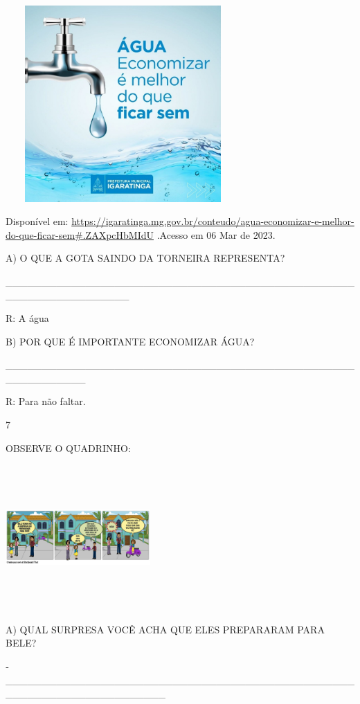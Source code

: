 {{{{{{\includegraphics[width=3.52778in,height=2.95347in]{media/image133.jpeg}

Disponível em:
\url{https://igaratinga.mg.gov.br/conteudo/agua-economizar-e-melhor-do-que-ficar-sem\#.ZAXpcHbMIdU}
.Acesso em 06 Mar de 2023.

A) O QUE A GOTA SAINDO DA TORNEIRA REPRESENTA?

\_\_\_\_\_\_\_\_\_\_\_\_\_\_\_\_\_\_\_\_\_\_\_\_\_\_\_\_\_\_\_\_\_\_\_\_\_\_\_\_\_\_\_\_\_\_\_\_\_\_\_\_\_\_\_\_\_\_\_\_\_\_\_\_\_

R: A água

B) POR QUE É IMPORTANTE ECONOMIZAR ÁGUA?

\_\_\_\_\_\_\_\_\_\_\_\_\_\_\_\_\_\_\_\_\_\_\_\_\_\_\_\_\_\_\_\_\_\_\_\_\_\_\_\_\_\_\_\_\_\_\_\_\_\_\_\_\_\_\_\_\_\_\_

R: Para não faltar.

\num{7}

OBSERVE O QUADRINHO:

\includegraphics[width=2.17917in,height=2.18750in]{media/image129.png}

A) QUAL SURPRESA VOCÊ ACHA QUE ELES PREPARARAM PARA BELE?

­­­­­­­­­­­­­­­­­­­­­­­\_\_\_\_\_\_\_\_\_\_\_\_\_\_\_\_\_\_\_\_\_\_\_\_\_\_\_\_\_\_\_\_\_\_\_\_\_\_\_\_\_\_\_\_\_\_\_\_\_\_\_\_\_\_\_\_\_\_\_\_\_\_\_\_\_\_\_\_\_\_

}}}}}}
